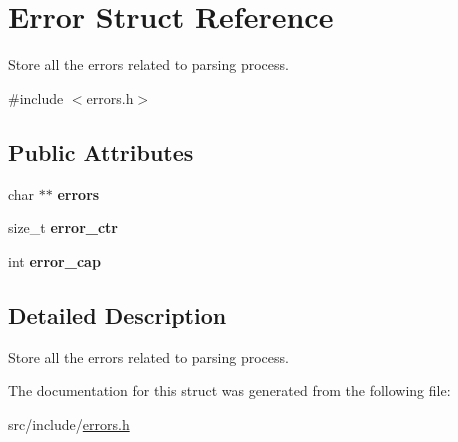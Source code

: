 \hypertarget{struct_error}{}\section{Error Struct Reference}
\label{struct_error}


Store all the errors related to parsing process.  




{\ttfamily \#include $<$errors.\+h$>$}

\subsection*{Public Attributes}
\begin{DoxyCompactItemize}
\item 
\mbox{\label{struct_error_a40f861f14f01f089946f96c4bd71696f}} 
char $\ast$$\ast$ {\bfseries errors}
\item 
\mbox{\label{struct_error_ab8e91a2a36d960644a38e9b4ad9d4713}} 
size\+\_\+t {\bfseries error\+\_\+ctr}
\item 
\mbox{\label{struct_error_a72159ae89697ccb8947962353a06ff37}} 
int {\bfseries error\+\_\+cap}
\end{DoxyCompactItemize}


\subsection{Detailed Description}
Store all the errors related to parsing process. 

The documentation for this struct was generated from the following file\+:\begin{DoxyCompactItemize}
\item 
src/include/\mbox{\hyperlink{errors_8h}{errors.\+h}}\end{DoxyCompactItemize}
